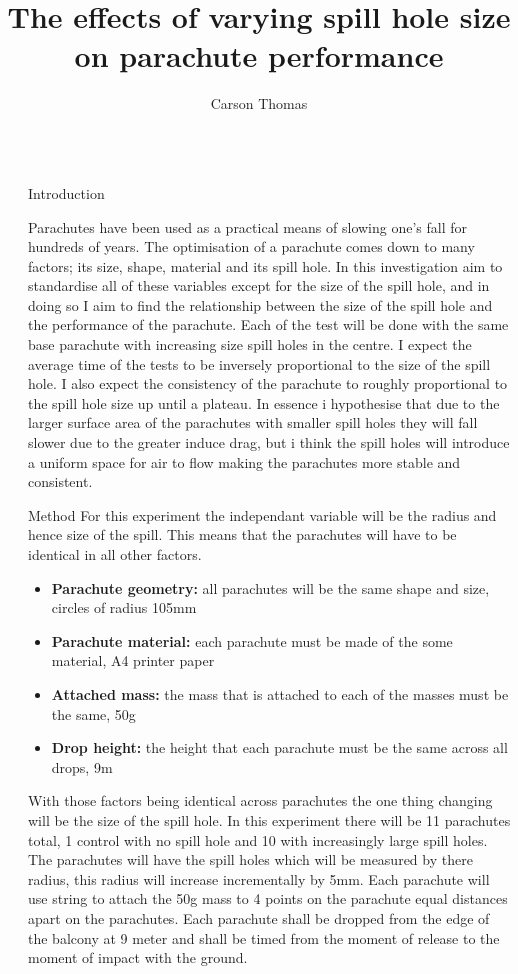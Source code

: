 \documentclass[final]{beamer}
\title{The effects of varying spill hole size on parachute performance}
\author{Carson Thomas}
\institute[shortinst]{Albert Park College}
\newlength{\sepwidth}
\newlength{\colwidth}
\newcommand{\separatorcolumn}{\begin{column}{\sepwidth}\end{column}}
\begin{document}
\begin{frame}[t]
\begin{columns}[t]
\separatorcolumn

\begin{column}{\colwidth}

  \begin{block}{Introduction}

    Parachutes have been used as a practical means of slowing one's fall for hundreds of years. The optimisation of a parachute comes down to many factors; its size, shape, material and its spill hole. In this investigation aim to standardise all of these variables except for the size of the spill hole, and in doing so I aim to find the relationship between the size of the spill hole and the performance of the parachute. Each of the test will be done with the same base parachute with increasing size spill holes in the centre. I expect the average time of the tests to be inversely proportional to the size of the spill hole. I also expect the consistency of the parachute to roughly proportional to the spill hole size up until a plateau. In essence i hypothesise that due to the larger surface area of the parachutes with smaller spill holes they will fall slower due to the greater induce drag, but i think the spill holes will introduce a uniform space for air to flow making the parachutes more stable and consistent.

  \end{block}

  \begin{block}{Method}
For this experiment the independant variable will be the radius and hence size of the spill. This means that the parachutes will have to be identical in all other factors. 

    \begin{itemize}
      \item \textbf{Parachute geometry:} all parachutes will be the same shape and size, circles of radius 105mm
      \item \textbf{Parachute material:} each parachute must be made of the some material, A4 printer paper
      \item \textbf{Attached mass:} the mass that is attached to each of the masses must be the same, 50g
       \item \textbf{Drop height:} the height that each parachute must be the same across all drops, 9m 
    \end{itemize}

With those factors being identical across parachutes the one thing changing will be the size of the spill hole. In this experiment there will be 11 parachutes total, 1 control with no spill hole and 10 with increasingly large spill holes. The parachutes will have the spill holes which will be measured by there radius, this radius will increase incrementally by 5mm. Each parachute will use string to attach the 50g mass to 4 points on the parachute equal distances apart on the parachutes. Each parachute shall be dropped from the edge of the balcony at 9 meter and shall be timed from the moment of release to the moment of impact with the ground.


\end{block}
\end{column}
\end{columns}
\end{frame}
\end{document}

